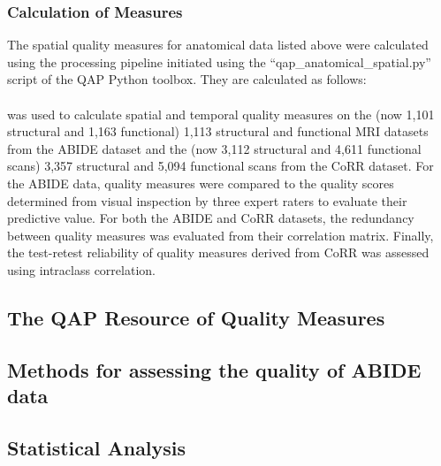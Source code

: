 \documentclass{frontiersSCNS} %
\begin{document}
\subsubsection{Calculation of Measures}
\label{sec:21}
The spatial quality measures for anatomical data listed above were calculated using the processing pipeline initiated using the “qap\_anatomical\_spatial.py” script of the QAP Python toolbox. They are calculated as follows:
\\\\
was used to calculate spatial and temporal quality measures on the (now 1,101 structural and 1,163 functional) 1,113 structural and functional MRI datasets from the ABIDE dataset and the (now 3,112 structural and 4,611 functional scans) 3,357 structural and 5,094 functional scans from the CoRR dataset. For the ABIDE data, quality measures were compared to the quality scores determined from visual inspection by three expert raters to evaluate their predictive value. For both the ABIDE and CoRR datasets, the redundancy between quality measures was evaluated from their correlation matrix. Finally, the test­-retest reliability of quality measures derived from CoRR was assessed using intra­class correlation.
\subsection{The QAP Resource of Quality Measures}
\label{sec:22}
\subsection{Methods for assessing the quality of ABIDE data}
\label{sec:23}
\subsection{Statistical Analysis}
\label{sec:24}
\end{document}
